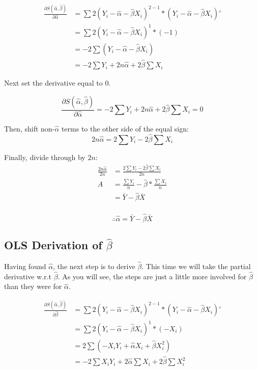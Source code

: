 \documentclass[11pt,openany]{book}\usepackage[]{graphicx}\usepackage[]{color}
\begin{document}
{\begin{align*}
\frac{\partial S(\hat{\alpha},\hat{\beta})}{\partial \hat{\alpha}} &= \sum
2(Y_{i}-\hat{\alpha}-\hat{\beta}X_{i})^{2-1}*(Y_{i}-\hat{\alpha}-\hat{\beta}X_{i})' \\
&= \sum 2(Y_{i}-\hat{\alpha}-\hat{\beta}X_{i})^{1}*(-1) \\
&= -2 \sum (Y_{i}-\hat{\alpha}-\hat{\beta}X_{i}) \\ 
&= -2 \sum Y_{i}+2n\hat{\alpha}+2\hat{\beta} \sum X_{i} 
\end{align*}

\noindent Next set the derivative equal to $0$. 

\begin{equation*}
\frac{\partial S(\hat{\alpha},\hat{\beta})}{\partial \hat{\alpha}} =  -2 \sum Y_{i}+2n\hat{\alpha}+2\hat{\beta} \sum X_{i} = 0 
\end{equation*}

\noindent Then, shift non-$\hat{\alpha}$ terms to the other side of the equal sign:
\begin{equation*}
2n\hat{\alpha} = 2 \sum Y_{i}-2\hat{\beta} \sum X_{i} 
\end{equation*}

\noindent Finally, divide through by $2n$: 
\begin{align*}
\frac{2n\hat{\alpha}}{2n} &= \frac{2 \sum Y_{i}-2\hat{\beta} \sum X_{i}}{2n} \\
A &= \frac{\sum Y_{i}}{n}-\hat{\beta}*\frac{\sum X_{i}}{n} \\
&= \bar {Y}-\hat{\beta} \bar{X} \\
\end{align*}

\begin{equation}
\label{eq:A} 
\therefore \hat{\alpha} = \bar {Y}-\hat{\beta} \bar{X} 
\end{equation}


\subsection{OLS Derivation of $\hat{\beta}$}

Having found $\hat{\alpha}$, the next step is to derive $\hat{\beta}$. This time we will take the partial derivative w.r.t $\hat{\beta}$. As you will see, the steps are just a little more involved for $\hat{\beta}$ than they were for $\hat{\alpha}$.

\begin{align*}
\frac{\partial S(\hat{\alpha},\hat{\beta})}{\partial \hat{\beta}} &= \sum
2(Y_{i}-\hat{\alpha}-\hat{\beta}X_{i})^{2-1}*(Y_{i}-\hat{\alpha}-\hat{\beta}X_{i})' \\
&= \sum 2(Y_{i}-\hat{\alpha}-\hat{\beta}X_{i})^{1}*(-X_{i}) \\
&= 2 \sum (-X_{i}Y_{i}+\hat{\alpha}X_{i}+\hat{\beta}X^{2}_{i}) \\ 
&= -2 \sum X_{i}Y_{i}+2\hat{\alpha} \sum X_{i} + 2\hat{\beta} \sum X^{2}_{i}  
\end{align*}

}
\end{document}
